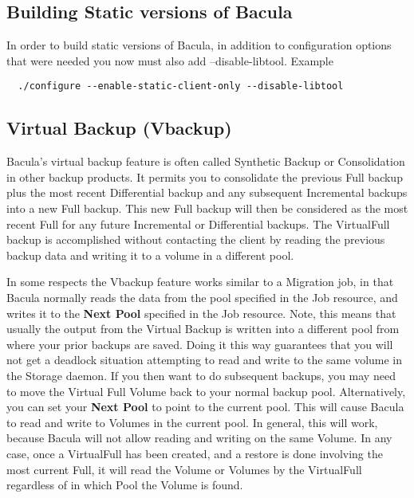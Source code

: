 \subsection{Building Static versions of Bacula}
In order to build static versions of Bacula, in addition
to configuration options that were needed you now must
also add --disable-libtool.  Example

\begin{verbatim}
  ./configure --enable-static-client-only --disable-libtool
\end{verbatim}


\subsection{Virtual Backup (Vbackup)}

Bacula's virtual backup feature is often called Synthetic Backup or
Consolidation in other backup products.  It permits you to consolidate the
previous Full backup plus the most recent Differential backup and any
subsequent Incremental backups into a new Full backup.  This new Full
backup will then be considered as the most recent Full for any future
Incremental or Differential backups.  The VirtualFull backup is
accomplished without contacting the client by reading the previous backup
data and writing it to a volume in a different pool.

In some respects the Vbackup feature works similar to a Migration job, in
that Bacula normally reads the data from the pool specified in the 
Job resource, and writes it to the {\bf Next Pool} specified in the 
Job resource. Note, this means that usually the output from the Virtual
Backup is written into a different pool from where your prior backups
are saved. Doing it this way guarantees that you will not get a deadlock
situation attempting to read and write to the same volume in the Storage
daemon. If you then want to do subsequent backups, you may need to
move the Virtual Full Volume back to your normal backup pool.
Alternatively, you can set your {\bf Next Pool} to point to the current
pool.  This will cause Bacula to read and write to Volumes in the
current pool. In general, this will work, because Bacula will
not allow reading and writing on the same Volume. In any case, once
a VirtualFull has been created, and a restore is done involving the
most current Full, it will read the Volume or Volumes by the VirtualFull 
regardless of in which Pool the Volume is found.

